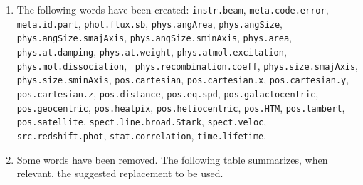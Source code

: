 \documentclass[11pt,a4paper]{ivoa}
\begin{document}
\begin{enumerate}
\item \begin{flushleft}
The following words have been created: 
{\tt instr.beam}, {\tt meta.code.error}, {\tt meta.id.part}, {\tt phot.flux.sb}, 
{\tt phys.angArea}, {\tt phys.angSize}, {\tt phys.angSize.smajAxis}, {\tt phys.angSize.sminAxis}, {\tt phys.area}, 
{\tt phys.at.damping}, {\tt phys.at.weight}, {\tt phys.atmol.excitation}, {\tt phys.mol.dissociation}, {\tt 
phys.recombination.coeff}, {\tt phys.size.smajAxis}, {\tt phys.size.sminAxis}, {\tt pos.cartesian}, {\tt pos.cartesian.x},
{\tt pos.cartesian.y}, {\tt pos.cartesian.z}, {\tt pos.distance}, {\tt pos.eq.spd}, {\tt pos.galactocentric}, {\tt 
pos.geocentric}, {\tt pos.healpix}, {\tt pos.heliocentric}, {\tt pos.HTM}, {\tt pos.lambert}, {\tt pos.satellite}, 
{\tt spect.line.broad.Stark}, {\tt spect.veloc}, {\tt src.redshift.phot}, {\tt stat.correlation}, {\tt time.lifetime}.
\end{flushleft}
\item Some words have been removed. The following table summarizes, when relevant, the suggested replacement to be used. 


\end{enumerate}
\end{document}
